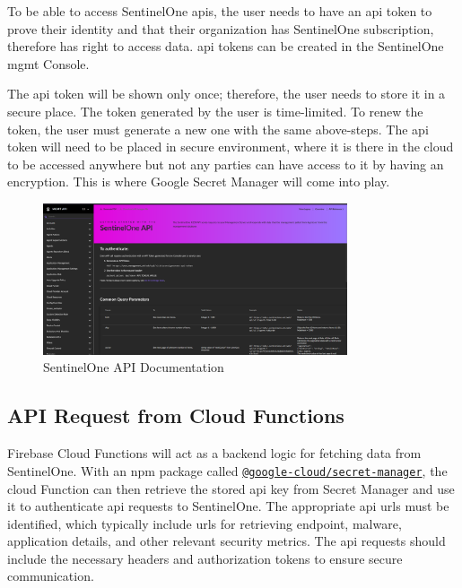 To be able to access SentinelOne \acrshort{api}s, the user needs to have an \acrshort{api} token to prove their
identity and that their organization has SentinelOne subscription, therefore has right to access data.
\acrshort{api} tokens can be created in the SentinelOne \acrshort{mgmt} Console.

The \acrshort{api} token will be shown only once; therefore, the user needs to store it in a secure place.
The token generated by the user is time-limited. To renew the token, the user must generate a new one with the same above-steps. The
\acrshort{api} token will need to be placed in secure environment, where it is there in the cloud to be accessed anywhere but not any
parties can have access to it by having an encryption. This is where Google Secret Manager will come into play.

\begin{figure}[htbp]
      \centering
      \includegraphics[width=0.8\textwidth]{Figures/SentinelOne/API Doc.png}
      \caption{SentinelOne API Documentation}
\end{figure}

\subsection{API Request from Cloud Functions}

Firebase Cloud Functions will act as a backend logic for fetching data from SentinelOne. With an \acrshort{npm} package called
\href{https://www.npmjs.com/package/@google-cloud/secret-manager}{\texttt{@google-cloud/secret-manager}}, the cloud Function
can then retrieve the stored \acrshort{api} key from Secret Manager and use it to authenticate \acrshort{api} requests to SentinelOne.
The appropriate \acrshort{api} \acrshort{url}s must be identified, which typically include \acrshort{url}s for retrieving endpoint,
malware, application details, and other relevant security metrics. The \acrshort{api} requests should include the necessary headers and
authorization tokens to ensure secure communication.

